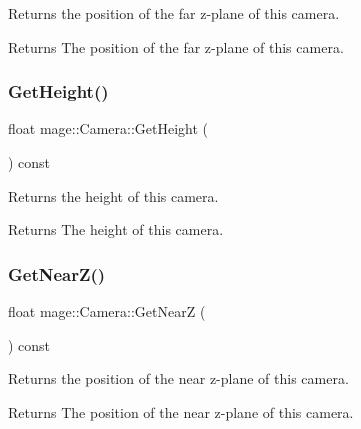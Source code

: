 Returns the position of the far z-\/plane of this camera.

\begin{DoxyReturn}{Returns}
The position of the far z-\/plane of this camera. 
\end{DoxyReturn}
\hypertarget{classmage_1_1_camera_a4c6c5e96085651ce29cd6e87543d21ec}{}\label{classmage_1_1_camera_a4c6c5e96085651ce29cd6e87543d21ec} 
\subsubsection{\texorpdfstring{Get\+Height()}{GetHeight()}}
{\footnotesize\ttfamily float mage\+::\+Camera\+::\+Get\+Height (\begin{DoxyParamCaption}{ }\end{DoxyParamCaption}) const}

Returns the height of this camera.

\begin{DoxyReturn}{Returns}
The height of this camera. 
\end{DoxyReturn}
\hypertarget{classmage_1_1_camera_a175e3c36526a8a3e28cd2f8bd1701c55}{}\label{classmage_1_1_camera_a175e3c36526a8a3e28cd2f8bd1701c55} 
\subsubsection{\texorpdfstring{Get\+Near\+Z()}{GetNearZ()}}
{\footnotesize\ttfamily float mage\+::\+Camera\+::\+Get\+NearZ (\begin{DoxyParamCaption}{ }\end{DoxyParamCaption}) const}

Returns the position of the near z-\/plane of this camera.

\begin{DoxyReturn}{Returns}
The position of the near z-\/plane of this camera. 
\end{DoxyReturn}
\hypertarget{classmage_1_1_camera_a1f5206864cf18b5548219492556df5d2}{}\label{classmage_1_1_camera_a1f5206864cf18b5548219492556df5d2} 
